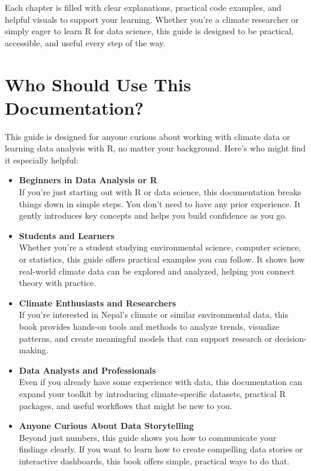 Each chapter is filled with clear explanations, practical code examples, and helpful visuals to support your learning. Whether you’re a climate researcher or simply eager to learn R for data science, this guide is designed to be practical, accessible, and useful every step of the way.
\section*{Who Should Use This Documentation?}
This guide is designed for anyone curious about working with climate data or learning data analysis with R, no matter your background. Here’s who might find it especially helpful:
\begin{itemize}
\item\textbf{Beginners in Data Analysis or R}\\
 If you’re just starting out with R or data science, this documentation breaks things down in simple steps. You don’t need to have any prior experience. It gently introduces key concepts and helps you build confidence as you go.
\item\textbf{Students and Learners}\\
 Whether you’re a student studying environmental science, computer science, or statistics, this guide offers practical examples you can follow. It shows how real-world climate data can be explored and analyzed, helping you connect theory with practice.
\item\textbf{Climate Enthusiasts and Researchers}\\
 If you’re interested in Nepal’s climate or similar environmental data, this book provides hands-on tools and methods to analyze trends, visualize patterns, and create meaningful models that can support research or decision-making.
\item\textbf{ Data Analysts and Professionals}\\
 Even if you already have some experience with data, this documentation can expand your toolkit by introducing climate-specific datasets, practical R packages, and useful workflows that might be new to you.
\item\textbf{Anyone Curious About Data Storytelling}\\
 Beyond just numbers, this guide shows you how to communicate your findings clearly. If you want to learn how to create compelling data stories or interactive dashboards, this book offers simple, practical ways to do that.

\end{itemize}

